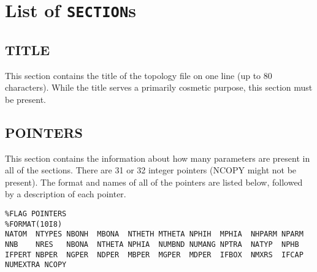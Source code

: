 \section{List of {\tt SECTION}s}

\subsection*{TITLE}

This section contains the title of the topology file on one line (up to 80
characters). While the title serves a primarily cosmetic purpose, this section
must be present.


\subsection*{POINTERS}

This section contains the information about how many parameters are present in
all of the sections. There are 31 or 32 integer pointers (NCOPY might not be
present). The format and names of all of the pointers are listed below, followed
by a description of each pointer.

\vspace{8pt}
\hline
\vspace{4pt}

\begin{verbatim}
%FLAG POINTERS
%FORMAT(10I8)
NATOM  NTYPES NBONH  MBONA  NTHETH MTHETA NPHIH  MPHIA  NHPARM NPARM  
NNB    NRES   NBONA  NTHETA NPHIA  NUMBND NUMANG NPTRA  NATYP  NPHB   
IFPERT NBPER  NGPER  NDPER  MBPER  MGPER  MDPER  IFBOX  NMXRS  IFCAP  
NUMEXTRA NCOPY 
\end{verbatim}

\vspace{4pt}
\hline
\vspace{8pt}

